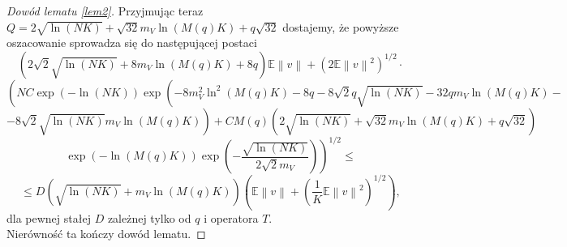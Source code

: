 \documentclass{mwart}
\newcommand{\norm}[1]{\left\lVert#1\right\rVert}
\begin{document}
\begin{proof}[Dowód lematu \ref{lem2}]
Przyjmując teraz $Q=2\sqrt{\ln (NK)}+\sqrt{32}m_V\ln (M(q)K)+q\sqrt{32}$ dostajemy, że powyższe oszacowanie sprowadza się do następującej postaci
\begin{displaymath}
\left(2\sqrt{2}\sqrt{\ln (NK)}+8m_V\ln (M(q)K)+8q\right)\mathbb{E}\norm{v}+\left(2\mathbb{E}\norm{v}^2\right)^{1/2}\cdot
\end{displaymath}
\begin{displaymath}
\left(NC\exp\left(-\ln (NK)\right)\exp\left(-8m^2_V\ln^2 (M(q)K)-8q-8\sqrt{2}q\sqrt{\ln (NK)}-32qm_V\ln (M(q)K)-\right.\right.
\end{displaymath}
\begin{displaymath}
\left.\left.-8\sqrt{2}\sqrt{\ln (NK)}m_V\ln (M(q)K)\right)+CM(q)\left(2\sqrt{\ln (NK)}+\sqrt{32}m_V\ln (M(q)K)+q\sqrt{32}\right)\right.
\end{displaymath}
\begin{displaymath}
\left. \exp\left(-\ln (M(q)K)\right)\exp \left(-\frac{\sqrt{\ln (NK)}}{2\sqrt{2}m_V}\right)\right)^{1/2}\leq
\end{displaymath}
\begin{displaymath}
\leq D\left(\sqrt{\ln (NK)}+m_V\ln (M(q)K)\right)\left(\mathbb{E}\norm{v}+\left(\frac{1}{K}\mathbb{E}\norm{v}^2\right)^{1/2}\right),
\end{displaymath}
dla pewnej stałej $D$ zależnej tylko od $q$ i operatora $T$.\\
Nierówność ta kończy dowód lematu.
\end{proof}
\end{document}
